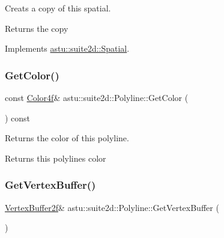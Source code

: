 Creats a copy of this spatial.

\begin{DoxyReturn}{Returns}
the copy 
\end{DoxyReturn}


Implements \hyperlink{classastu_1_1suite2d_1_1Spatial_a5c058079c94b0e8d7590e70ca2159bd1}{astu\+::suite2d\+::\+Spatial}.

\mbox{\label{classastu_1_1suite2d_1_1Polyline_a6d75bf4ea2c4ff03260f336fe27541a7}} 
\subsubsection{\texorpdfstring{Get\+Color()}{GetColor()}}
{\footnotesize\ttfamily const \hyperlink{classastu_1_1Color}{Color4f}\& astu\+::suite2d\+::\+Polyline\+::\+Get\+Color (\begin{DoxyParamCaption}{ }\end{DoxyParamCaption}) const\hspace{0.3cm}{\ttfamily [inline]}}

Returns the color of this polyline.

\begin{DoxyReturn}{Returns}
this polyline\textquotesingle{}s color 
\end{DoxyReturn}
\mbox{\label{classastu_1_1suite2d_1_1Polyline_aeb8d924a70278166a553d099cec2f5fe}} 
\subsubsection{\texorpdfstring{Get\+Vertex\+Buffer()}{GetVertexBuffer()}}
{\footnotesize\ttfamily \hyperlink{group__gfx__group_ga081cf45a441eef100dfbb1e0f64c3826}{Vertex\+Buffer2f}\& astu\+::suite2d\+::\+Polyline\+::\+Get\+Vertex\+Buffer (\begin{DoxyParamCaption}{ }\end{DoxyParamCaption})\hspace{0.3cm}{\ttfamily [inline]}}

